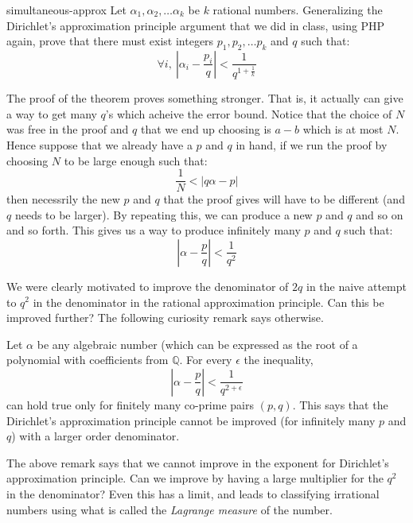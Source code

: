 \begin{exercise-prob}
\begin{show-ps1}{simultaneous-approx}
Let $\alpha_1, \alpha_2, \ldots \alpha_k$ be $k$ rational numbers. Generalizing the Dirichlet's approximation principle argument that we did in class, using PHP again, prove that there must exist integers $p_1, p_2, \ldots p_k$ and $q$ such that:
$$\forall i,~\left| \alpha_i - \frac{p_i}{q} \right| < \frac{1}{q^{1+\frac{1}{k}}}$$
\end{show-ps1}
\end{exercise-prob}

\begin{remark}
The proof of the theorem proves something stronger. That is, it actually can give a way to get many $q$'s which acheive the error bound. Notice that the choice of $N$ was free in the proof and $q$ that we end up choosing is $a-b$ which is at most $N$. Hence suppose that we already have a $p$ and $q$ in hand, if we run the proof by choosing $N$ to be large enough such that:
$$\frac{1}{N} < |q\alpha - p|$$
then necessrily the new $p$ and $q$ that the proof gives will have to be different (and $q$ needs to be larger). By repeating this, we can produce a new $p$ and $q$ and so on and so forth. This gives us a way to produce infinitely many $p$ and $q$ such that:
$$\left| \alpha - \frac{p}{q} \right| < \frac{1}{q^2} $$
\end{remark}

We were clearly motivated to improve the denominator of $2q$ in the naive attempt to $q^2$ in the denominator in the rational approximation principle. Can this be improved further? The following curiosity remark says otherwise.

\begin{curiosity}
Let $\alpha$ be any algebraic number (which can be expressed as the root of a polynomial with coefficients from $\mathbb{Q}$. For every $\epsilon$ the inequality,
$$\left| \alpha - \frac{p}{q} \right| < \frac{1}{q^{2+\epsilon}}$$
can hold true only for finitely many co-prime pairs $(p,q)$. This says that the Dirichlet's approximation principle cannot be improved (for infinitely many $p$ and $q$) with a larger order denominator.
\end{curiosity}

The above remark says that we cannot improve in the exponent for Dirichlet's approximation principle. Can we improve by having a large multiplier for the $q^2$ in the denominator? Even this has a limit, and leads to classifying irrational numbers using what is called the \textit{Lagrange measure} of the number.

